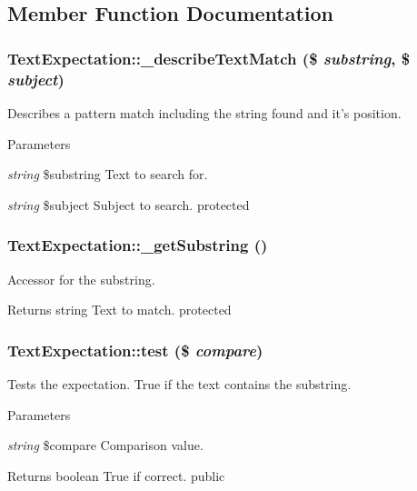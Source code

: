 \subsection{Member Function Documentation}
\hypertarget{class_text_expectation_aa2dce89d22209c3046dc9f5c994f0de3}{
\subsubsection[{\_\-describeTextMatch}]{\setlength{\rightskip}{0pt plus 5cm}TextExpectation::\_\-describeTextMatch (\$ {\em substring}, \/  \$ {\em subject})}}
\label{class_text_expectation_aa2dce89d22209c3046dc9f5c994f0de3}
Describes a pattern match including the string found and it's position. 
\begin{DoxyParams}{Parameters}
\item[{\em string}]\$substring Text to search for. \item[{\em string}]\$subject Subject to search.  protected \end{DoxyParams}
\hypertarget{class_text_expectation_a2569a76d2367fa368af6de6441930c53}{
\subsubsection[{\_\-getSubstring}]{\setlength{\rightskip}{0pt plus 5cm}TextExpectation::\_\-getSubstring ()}}
\label{class_text_expectation_a2569a76d2367fa368af6de6441930c53}
Accessor for the substring. \begin{DoxyReturn}{Returns}
string Text to match.  protected 
\end{DoxyReturn}
\hypertarget{class_text_expectation_a352a2a95ccf1c29c886b7608338d3c20}{
\subsubsection[{test}]{\setlength{\rightskip}{0pt plus 5cm}TextExpectation::test (\$ {\em compare})}}
\label{class_text_expectation_a352a2a95ccf1c29c886b7608338d3c20}
Tests the expectation. True if the text contains the substring. 
\begin{DoxyParams}{Parameters}
\item[{\em string}]\$compare Comparison value. \end{DoxyParams}
\begin{DoxyReturn}{Returns}
boolean True if correct.  public 
\end{DoxyReturn}


